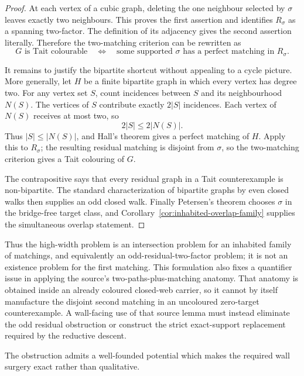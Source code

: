 \begin{proof}
At each vertex of a cubic graph, deleting the one neighbour selected by
\(\sigma\) leaves exactly two neighbours.  This proves the first assertion
and identifies \(R_\sigma\) as a spanning two-factor.  The definition of its
adjacency gives the second assertion literally.  Therefore the two-matching
criterion can be rewritten as
\[
 G\text{ is Tait colourable}
 \quad\Longleftrightarrow\quad
 \text{some supported }\sigma\text{ has a perfect matching in }R_\sigma.
\]

It remains to justify the bipartite shortcut without appealing to a cycle
picture.  More generally, let \(H\) be a finite bipartite graph in which
every vertex has degree two.  For any vertex set \(S\), count incidences
between \(S\) and its neighbourhood \(N(S)\).  The vertices of \(S\)
contribute exactly \(2|S|\) incidences.  Each vertex of \(N(S)\) receives at
most two, so
\[
                         2|S|\leq 2|N(S)|.
\]
Thus \(|S|\leq |N(S)|\), and Hall's theorem gives a perfect matching of
\(H\).  Apply this to \(R_\sigma\); the resulting residual matching is
disjoint from \(\sigma\), so the two-matching criterion gives a Tait
colouring of \(G\).

The contrapositive says that every residual graph in a Tait counterexample
is non-bipartite.  The standard characterization of bipartite graphs by even
closed walks then supplies an odd closed walk.  Finally Petersen's theorem
chooses \(\sigma\) in the bridge-free target class, and
Corollary~\ref{cor:inhabited-overlap-family} supplies the simultaneous overlap
statement.
\end{proof}

Thus the high-width problem is an intersection problem for an inhabited
family of matchings, and equivalently an odd-residual-two-factor problem; it
is not an existence problem for the first matching.  This formulation also
fixes a quantifier issue in applying the source's two-paths-plus-matching
anatomy.  That anatomy is obtained inside an already coloured closed-web
carrier, so it cannot by itself manufacture the disjoint second matching in
an uncoloured zero-target counterexample.  A wall-facing use of that source
lemma must instead eliminate the odd residual obstruction or construct the
strict exact-support replacement required by the reductive descent.

The obstruction admits a well-founded potential which makes the required
wall surgery exact rather than qualitative.

